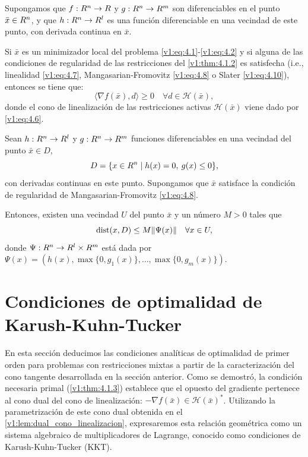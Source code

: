 
\begin{theorem}\label{v1:thm:4.1.3}
 Supongamos que $f : R^n \to R$ y $g : R^n \to R^m$ son diferenciables en el punto $\bar{x} \in R^n$, y que $h : R^n \to R^l$ es una función diferenciable en una vecindad de este punto, con derivada continua en $\bar{x}$.
 
 Si $\bar{x}$ es un minimizador local del problema \eqref{v1:eq:4.1}-\eqref{v1:eq:4.2} y si alguna de las condiciones de regularidad de las restricciones del \cref{v1:thm:4.1.2} es satisfecha (i.e., linealidad \eqref{v1:eq:4.7}, Mangasarian-Fromovitz \eqref{v1:eq:4.8} o Slater \eqref{v1:eq:4.10}), entonces se tiene que:
 \[
 \langle \nabla f(\bar{x}), d \rangle \ge 0 \quad \forall d \in \mathcal{H}(\bar{x}),
 \]
 donde el cono de linealización de las restricciones activas $\mathcal{H}(\bar{x})$ viene dado por \eqref{v1:eq:4.6}.
\end{theorem}

\begin{theorem}\label{v1:thm:4.1.4}
 Sean $h : R^n \to R^l$ y $g : R^n \to R^m$ funciones diferenciables en una vecindad del punto $\bar{x} \in D$,
 \[
 D = \{x \in R^n \mid h(x) = 0, \: g(x) \le 0\},
 \]
 con derivadas continuas en este punto. Supongamos que $\bar{x}$ satisface la condición de regularidad de Mangasarian-Fromovitz \eqref{v1:eq:4.8}.
 
 Entonces, existen una vecindad $U$ del punto $\bar{x}$ y un número $M > 0$ tales que
 \begin{equation}
 \operatorname{dist}(x, D) \le M \lVert\Psi(x)\rVert \quad \forall x \in U,
 \label{v1:eq:4.15}
 \end{equation}
 donde $\Psi : R^n \to R^l \times R^m$ está dada por $\Psi(x) = (h(x), \max\{0, g_1(x)\}, \dots, \max\{0, g_m(x)\})$.
\end{theorem}

\section{Condiciones de optimalidad de Karush-Kuhn-Tucker}

En esta sección deducimos las condiciones analíticas de optimalidad de primer orden para problemas con restricciones mixtas a partir de la caracterización del cono tangente desarrollada en la sección anterior. Como se demostró, la condición necesaria primal (\cref{v1:thm:4.1.3}) establece que el opuesto del gradiente pertenece al cono dual del cono de linealización: $-\nabla f(\bar{x}) \in \mathcal{H}(\bar{x})^*$. Utilizando la parametrización de este cono dual obtenida en el \cref{v1:lem:dual_cono_linealizacion}, expresaremos esta relación geométrica como un sistema algebraico de multiplicadores de Lagrange, conocido como condiciones de Karush-Kuhn-Tucker (KKT).

